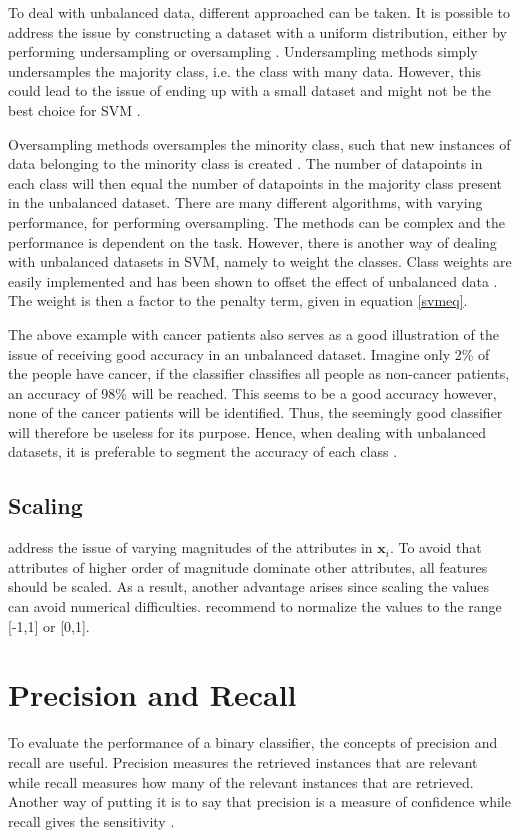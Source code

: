 To deal with unbalanced data, different approached can be taken. It is possible to address the issue by constructing a dataset with a uniform distribution, either by performing undersampling or oversampling \citep{delRio2014}. Undersampling methods simply undersamples the majority class, i.e. the class with many data. However, this could lead to the issue of ending up with a small dataset and might not be the best choice for SVM \citep{Akbani2004}. 

Oversampling methods oversamples the minority class, such that new instances of data belonging to the minority class is created \citep{delRio2014,Akbani2004}. The number of datapoints in each class will then equal the number of datapoints in the majority class present in the unbalanced dataset. There are many different algorithms, with varying performance, for performing oversampling. The methods can be complex and the performance is dependent on the task. However, there is another way of dealing with unbalanced datasets in SVM, namely to weight the classes. Class weights are easily implemented and has been shown to offset the effect of unbalanced data \citep{Akbani2004}. The weight is then a factor to the penalty term, given in equation \eqref{svmeq}.

The above example with cancer patients also serves as a good illustration of the issue of receiving good accuracy in an unbalanced dataset. Imagine only 2\% of the people have cancer, if the classifier classifies all people as non-cancer patients, an accuracy of 98\% will be reached. This seems to be a good accuracy however, none of the cancer patients will be identified. Thus, the seemingly good classifier will therefore be useless for its purpose. Hence, when dealing with unbalanced datasets, it is preferable to segment the accuracy of each class \citep{delRio2014}. 

\subsection{Scaling \label{scale}}
\citet{Hsu10apractical} address the issue of varying magnitudes of the attributes in $\bm{x}_i$. To avoid that attributes of higher order of magnitude dominate other attributes, all features should be scaled. As a result, another advantage arises since scaling the values can avoid numerical difficulties. \citet{Hsu10apractical} recommend to normalize the values to the range [-1,1] or [0,1].

\section{Precision and Recall}
To evaluate the performance of a binary classifier, the concepts of precision and recall are useful. Precision measures the retrieved instances that are relevant while recall measures how many of the relevant instances that are retrieved. Another way of putting it is to say that precision is a measure of confidence while recall gives the sensitivity \citep{powers2011}.

